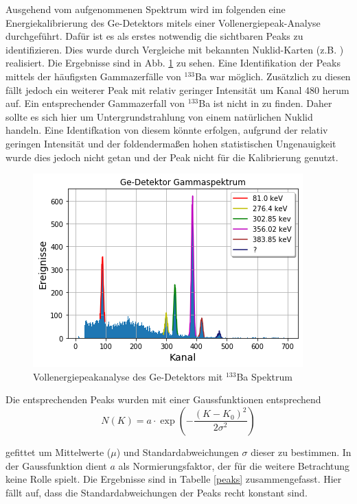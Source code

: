 Ausgehend vom aufgenommenen Spektrum wird im folgenden eine Energiekalibrierung des Ge-Detektors mitels einer Vollenergiepeak-Analyse durchgeführt.
Dafür ist es als erstes notwendig die sichtbaren Peaks zu identifizieren.
Dies wurde durch Vergleiche mit bekannten Nuklid-Karten (z.B. \cite{IAEA}) realisiert.
Die Ergebnisse sind in Abb. \ref{GeKali} zu sehen.
Eine Identifikation der Peaks mittels der häufigsten Gammazerfälle von $^{133}$Ba war möglich.
Zusätzlich zu diesen fällt jedoch ein weiterer Peak mit relativ geringer Intensität um Kanal 480 herum auf.
Ein entsprechender Gammazerfall von $^{133}$Ba ist nicht in \cite{IAEA} zu finden.
Daher sollte es sich hier um Untergrundstrahlung von einem natürlichen Nuklid handeln.
Eine Identifkation von diesem könnte erfolgen, aufgrund der relativ geringen Intensität und der foldendermaßen hohen statistischen Ungenauigkeit wurde dies jedoch nicht getan und der Peak nicht für die Kalibrierung genutzt.

\begin{figure}[h]
  \includegraphics[width=\linewidth]{images/ba133Kali.png}
  \caption{Vollenergiepeakanalyse des Ge-Detektors mit $^{133}$Ba Spektrum}
  \label{GeKali}
\end{figure}

Die entsprechenden Peaks wurden mit einer Gaussfunktionen entsprechend
\begin{equation}
N(K) = a \cdot \exp \left( - \frac{(K - K_{0})^{2}}{2 \sigma ^{2}} \right)
\end{equation}


gefittet um Mittelwerte ($\mu$) und Standardabweichungen {$\sigma$} dieser zu bestimmen.
In der Gaussfunktion dient $a$ als Normierungsfaktor, der für die weitere Betrachtung keine Rolle spielt.
Die Ergebnisse sind in Tabelle \ref{peaks} zusammengefasst.
Hier fällt auf, dass die Standardabweichungen der Peaks recht konstant sind.

